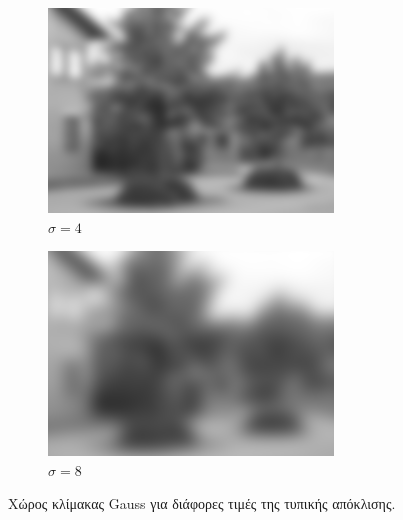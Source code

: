 \documentclass{beamer}
\begin{document}
\begin{frame}
\begin{figure}[H]
    \begin{subfigure}[b]{0.3\linewidth}
    \includegraphics[width=\linewidth]{Scalespace3.png}
    \caption{$\sigma=4$}
    \end{subfigure}
    \begin{subfigure}[b]{0.3\linewidth}
    \includegraphics[width=\linewidth]{Scalespace4.png}
    \caption{$\sigma=8$}
    \end{subfigure}

    \caption{Χώρος κλίμακας Gauss για διάφορες τιμές της τυπικής απόκλισης.}
    \label{fig:tGauss}
\end{figure}


\end{frame}
\end{document}
